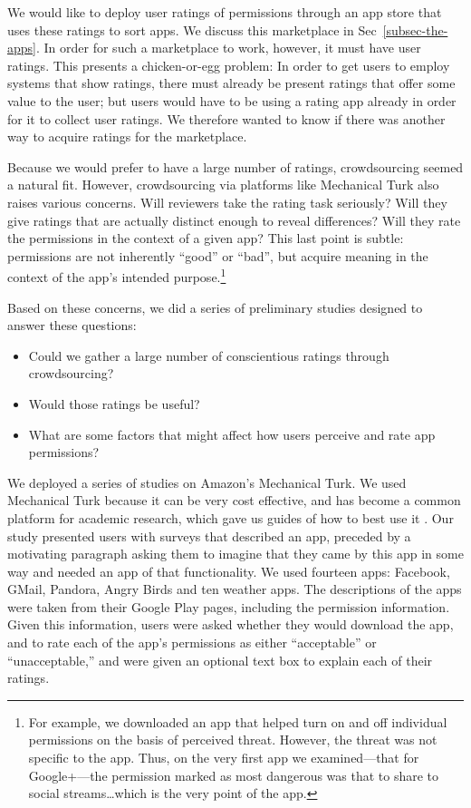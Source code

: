 \documentclass[11pt]{article}
\begin{document}
We would like to deploy user ratings of permissions
through an app store that uses these ratings to sort
apps. We discuss this marketplace in Sec~\ref{subsec-the-apps}.
In order for such a marketplace to work, however, it must have user
ratings. This presents a chicken-or-egg problem: In order to get users
to employ systems that show ratings, there must already be present
ratings that offer some value to the user; but users would have to be
using a rating app already in order for it to collect user
ratings. We therefore wanted to know if there was another way to
acquire ratings for the marketplace.

Because we would prefer to have a large number of ratings,
crowdsourcing seemed a natural fit. However, crowdsourcing via
platforms like Mechanical Turk also raises various concerns. Will
reviewers take the rating task seriously? Will they give ratings that
are actually distinct enough to reveal differences? Will they rate the
permissions in the context of a given app? This last point is subtle: permissions are
not inherently ``good'' or ``bad'', but acquire meaning in the context
of the app's intended purpose.\footnote{For example, we
  downloaded an app that helped turn on and off individual permissions
  on the basis of perceived threat. However, the threat was not
  specific to the app. Thus, on the very first app we examined---that
  for Google+---the permission marked as most dangerous was that to
  share to social streams\dots which is the very point of the app.}

Based on these concerns, we did a series of preliminary studies designed to answer
these questions:
\begin{itemize}
\item Could we gather a large number of conscientious ratings through crowdsourcing?
\item Would those ratings be useful?
\item What are some factors that might affect how users perceive and rate 
app permissions?
\end{itemize}
We deployed a series of studies on Amazon's Mechanical Turk. We used
Mechanical Turk because it can be very cost effective, and has become
a common platform for academic research, which gave us guides of how
to best use it \cite{reseach-mturk-BRM12, mturk-data-quality-PPS11}. 
Our study presented users with surveys that
described an app, preceded by a motivating paragraph asking
them to imagine that they came by this app in some way and needed an
app of that functionality.  We used fourteen apps: Facebook, GMail,
Pandora, Angry Birds and ten weather apps.  The descriptions
of the apps were taken from their Google Play pages, including the
permission information. Given this information, users were asked
whether they would download the app, and to rate each of the app's
permissions as either ``acceptable'' or ``unacceptable,'' and were
given an optional text box to explain each of their ratings.
\end{document}

